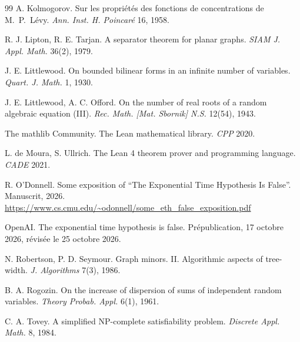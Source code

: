 \documentclass[11pt,a4paper]{article}
\theoremstyle{definition}
\theoremstyle{remark}
\begin{document}
\begin{thebibliography}{99}
 A. Kolmogorov. Sur les propri\'et\'es des fonctions de concentrations de
 M.~P.~L\'evy. \emph{Ann. Inst. H. Poincar\'e} 16, 1958.

 R. J. Lipton, R. E. Tarjan. A separator theorem for planar graphs.
 \emph{SIAM J. Appl. Math.} 36(2), 1979.

 J. E. Littlewood. On bounded bilinear forms in an infinite number of
 variables. \emph{Quart. J. Math.} 1, 1930.

 J. E. Littlewood, A. C. Offord. On the number of real roots of a random
 algebraic equation (III). \emph{Rec. Math. [Mat. Sbornik] N.S.} 12(54), 1943.

 The mathlib Community. The Lean mathematical library. \emph{CPP} 2020.

 L. de Moura, S. Ullrich. The Lean 4 theorem prover and programming language.
 \emph{CADE} 2021.

 R. O'Donnell. Some exposition of ``The Exponential Time Hypothesis Is
 False''. Manuscrit, 2026.
 \url{https://www.cs.cmu.edu/~odonnell/some_eth_false_exposition.pdf}

 OpenAI. The exponential time hypothesis is false. Prépublication, 17 octobre 2026,
 révisée le 25 octobre 2026.

 N. Robertson, P. D. Seymour. Graph minors. II. Algorithmic aspects of
 tree-width. \emph{J. Algorithms} 7(3), 1986.

 B. A. Rogozin. On the increase of dispersion of sums of independent random
 variables. \emph{Theory Probab. Appl.} 6(1), 1961.

 C. A. Tovey. A simplified NP-complete satisfiability problem.
 \emph{Discrete Appl. Math.} 8, 1984.

\end{thebibliography}
\end{document}
